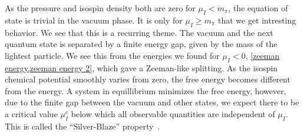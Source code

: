 As the pressure and isospin density both are zero for $\mu_I < m_\pi$, the equation of state is trivial in the vacuum phase.
It is only for $\mu_I \geq m_\pi$ that we get intresting behavior.
We see that this is a recurring theme.
The vacuum and the next quantum state is separated by a finite energy gap, given by the mass of the lightest particle.
We see this from the energies we found for $\mu_I < 0$, \cref{zeeman energy,zeeman energy 2}, which gave a Zeeman-like splitting.
As the isospin chemical potential smoothly varies from zero, the free energy becomes different from the energy.
A system in equillibrium minimizes the free energy, however, due to the finite gap between the vacuum and other states, we expect there to be a critical value $\mu_I^c$ below which all observable quantities are independent of $\mu_I$.
This is called the ``Silver-Blaze'' property~\cite{cohen:silver-blaze,cohen2}.


\FloatBarrier

